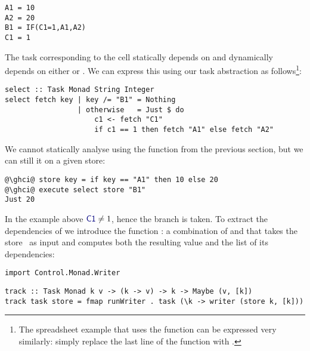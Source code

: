 \vspace{1mm}
\begin{verbatim}
A1 = 10
A2 = 20
B1 = IF(C1=1,A1,A2)
C1 = 1
\end{verbatim}
\vspace{1mm}

\noindent
The task corresponding to the cell  statically depends on  and
dynamically depends on either  or . We can express this using
our task abstraction as follows\footnote{The spreadsheet example that uses
the  function can be expressed very similarly: simply replace the
last line of the  function with .}:

\vspace{1mm}
\begin{verbatim}
select :: Task Monad String Integer
select fetch key | key /= "B1" = Nothing
                 | otherwise   = Just $ do
                     c1 <- fetch "C1"
                     if c1 == 1 then fetch "A1" else fetch "A2"
\end{verbatim}
\vspace{1mm}

We cannot statically analyse  using the function 
from the previous section, but we can still  it on a given store:

\vspace{1mm}
\begin{verbatim}
@\ghci@ store key = if key == "A1" then 10 else 20
@\ghci@ execute select store "B1"
Just 20
\end{verbatim}
\vspace{1mm}

\noindent
In the example above $\cmd{C1} \neq 1$, hence the  branch is taken.
To extract the dependencies of  we introduce the function :
a combination of  and  that takes the store~\store
as input and computes both the resulting value and the list of its dependencies:

\vspace{1mm}
\begin{verbatim}
import Control.Monad.Writer
\end{verbatim}
\vspace{0.5mm}
\begin{verbatim}
track :: Task Monad k v -> (k -> v) -> k -> Maybe (v, [k])
track task store = fmap runWriter . task (\k -> writer (store k, [k]))
\end{verbatim}
\vspace{1mm}

